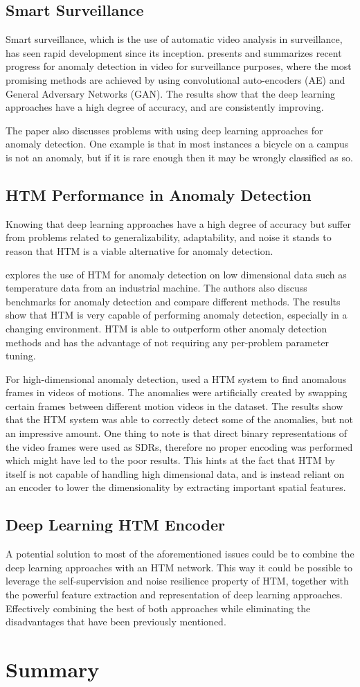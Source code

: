 \subsection{Smart Surveillance}
Smart surveillance, which is the use of automatic video analysis in surveillance, has seen rapid development since its inception. \cite{anomalyvideo} presents and summarizes recent progress for anomaly detection in video for surveillance purposes, where the most promising methods are achieved by using convolutional auto-encoders (AE) and General Adversary Networks (GAN). The results show that the deep learning approaches have a high degree of accuracy, and are consistently improving. \par
The paper also discusses problems with using deep learning approaches for anomaly detection. One example is that in most instances a bicycle on a campus is not an anomaly, but if it is rare enough then it may be wrongly classified as so.
\subsection{HTM Performance in Anomaly Detection}
Knowing that deep learning approaches have a high degree of accuracy but suffer from problems related to generalizability, adaptability, and noise it stands to reason that HTM is a viable alternative for anomaly detection.\par
\cite{AHMAD2017134} explores the use of HTM for anomaly detection on low dimensional data such as temperature data from an industrial machine. The authors also discuss benchmarks for anomaly detection and compare different methods. The results show that HTM is very capable of performing anomaly detection, especially in a changing environment. HTM is able to outperform other anomaly detection methods and has the advantage of not requiring any per-problem parameter tuning. \par
For high-dimensional anomaly detection, \cite{MotionAnomalyDetection} used a HTM system to find anomalous frames in videos of motions. The anomalies were artificially created by swapping certain frames between different motion videos in the dataset. The results show that the HTM system was able to correctly detect some of the anomalies, but not an impressive amount. One thing to note is that direct binary representations of the video frames were used as SDRs, therefore no proper encoding was performed which might have led to the poor results. This hints at the fact that HTM by itself is not capable of handling high dimensional data, and is instead reliant on an encoder to lower the dimensionality by extracting important spatial features. \subsection{Deep Learning HTM Encoder}
A potential solution to most of the aforementioned issues could be to combine the deep learning approaches with an HTM network. This way it could be possible to leverage the self-supervision and noise resilience property of HTM, together with the powerful feature extraction and representation of deep learning approaches. Effectively combining the best of both approaches while eliminating the disadvantages that have been previously mentioned.
\section{Summary}